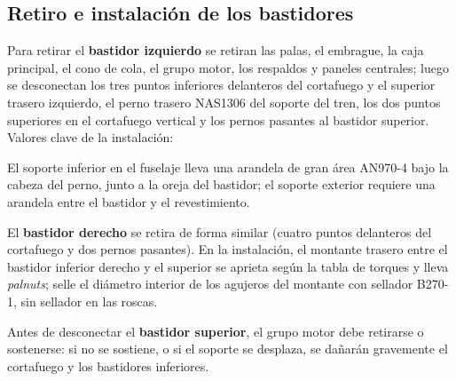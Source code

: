 \subsection{Retiro e instalación de los bastidores}

Para retirar el \textbf{bastidor izquierdo} se retiran las palas, el embrague, la caja principal, el cono de cola, el grupo motor, los respaldos y paneles centrales; luego se desconectan los tres puntos inferiores delanteros del cortafuego y el superior trasero izquierdo, el perno trasero NAS1306 del soporte del tren, los dos puntos superiores en el cortafuego vertical y los pernos pasantes al bastidor superior. Valores clave de la instalación:

\begin{checklist}
\end{checklist}

El soporte inferior en el fuselaje lleva una arandela de gran área AN970-4 bajo la cabeza del perno, junto a la oreja del bastidor; el soporte exterior requiere una arandela entre el bastidor y el revestimiento.

El \textbf{bastidor derecho} se retira de forma similar (cuatro puntos delanteros del cortafuego y dos pernos pasantes). En la instalación, el montante trasero entre el bastidor inferior derecho y el superior se aprieta según la tabla de torques y lleva \emph{palnuts}; selle el diámetro interior de los agujeros del montante con sellador B270-1, sin sellador en las roscas.

\begin{precaucion}
Antes de desconectar el \textbf{bastidor superior}, el grupo motor debe retirarse o sostenerse: si no se sostiene, o si el soporte se desplaza, se dañarán gravemente el cortafuego y los bastidores inferiores.
\end{precaucion}

